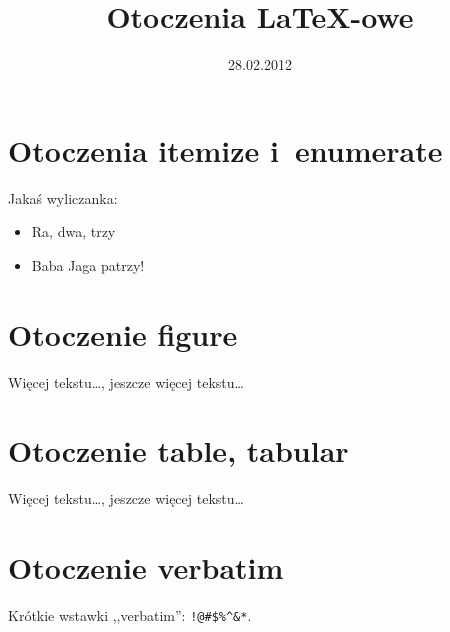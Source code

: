 \documentclass[a4paper,12pt]{article}
\title{Otoczenia \LaTeX-owe}
\date{28.02.2012}
\begin{document}
\pagestyle{empty}

\section*{Otoczenia itemize i~enumerate}

Jakaś wyliczanka:

\begin{itemize}
\item Ra, dwa, trzy
\item Baba Jaga patrzy!
\end{itemize}


\section*{Otoczenie figure}

Więcej tekstu\ldots, jeszcze więcej tekstu\ldots


\section*{Otoczenie table, tabular}

Więcej tekstu\ldots, jeszcze więcej tekstu\ldots

\section*{Otoczenie verbatim}

Krótkie wstawki ,,verbatim'': \verb|!@#$%^&*|.
\end{document}
